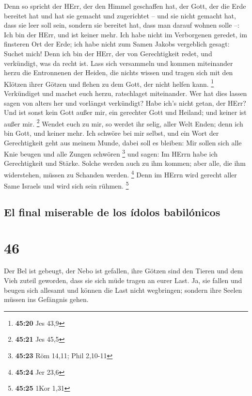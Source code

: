  Denn so spricht der HErr, der den Himmel geschaffen hat,
der Gott, der die Erde bereitet hat und hat sie gemacht und zugerichtet
-- und sie nicht gemacht hat, dass sie leer soll sein, sondern sie
bereitet hat, dass man darauf wohnen solle --: Ich bin der HErr, und ist
keiner mehr.  Ich habe nicht im Verborgenen geredet, im
finsteren Ort der Erde; ich habe nicht zum Samen Jakobs vergeblich
gesagt: Suchet mich! Denn ich bin der HErr, der von Gerechtigkeit redet,
und verkündigt, was da recht ist.  Lass sich versammeln
und kommen miteinander herzu die Entronnenen der Heiden, die nichts
wissen und tragen sich mit den Klötzen ihrer Götzen und flehen zu dem
Gott, der nicht helfen kann. \footnote{\textbf{45:20} Jes 43,9}
 Verkündiget und machet euch herzu, ratschlaget
miteinander. Wer hat dies lassen sagen von alters her und vorlängst
verkündigt? Habe ich's nicht getan, der HErr? Und ist sonst kein Gott
außer mir, ein gerechter Gott und Heiland; und keiner ist außer mir.
\footnote{\textbf{45:21} Jes 45,5}  Wendet euch zu mir,
so werdet ihr selig, aller Welt Enden; denn ich bin Gott, und keiner
mehr.  Ich schwöre bei mir selbst, und ein Wort der
Gerechtigkeit geht aus meinem Munde, dabei soll es bleiben: Mir sollen
sich alle Knie beugen und alle Zungen schwören \footnote{\textbf{45:23}
  Röm 14,11; Phil 2,10-11}  und sagen: Im HErrn habe ich
Gerechtigkeit und Stärke. Solche werden auch zu ihm kommen; aber alle,
die ihm widerstehen, müssen zu Schanden werden. \footnote{\textbf{45:24}
  Jer 23,6}  Denn im HErrn wird gerecht aller Same
Israels und wird sich sein rühmen. \footnote{\textbf{45:25} 1Kor 1,31}

\hypertarget{el-final-miserable-de-los-uxeddolos-babiluxf3nicos}{%
\subsection{El final miserable de los ídolos
babilónicos}\label{el-final-miserable-de-los-uxeddolos-babiluxf3nicos}}

\hypertarget{section-45}{%
\section{46}\label{section-45}}

 Der Bel ist gebeugt, der Nebo ist gefallen, ihre Götzen
sind den Tieren und dem Vieh zuteil geworden, dass sie sich müde tragen
an eurer Last.  Ja, sie fallen und beugen sich allesamt
und können die Last nicht wegbringen; sondern ihre Seelen müssen ins
Gefängnis gehen.

